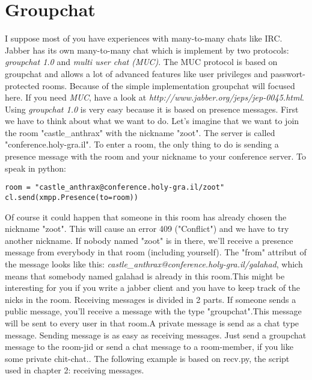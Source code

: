 \section{Groupchat}

I suppose most of you have experiences with many-to-many chats like IRC. Jabber has its own many-to-many chat which is implement by two protocols: \textit{groupchat 1.0} and \textit{multi user chat (MUC)}.
The MUC protocol is based on groupchat and allows a lot of advanced features like user privileges and passwort-protected rooms.
Because of the simple implementation groupchat will focused here.
If you need \textit{MUC}, have a look at \textit{http://www.jabber.org/jeps/jep-0045.html}.
\newline
\newline
Using \textit{groupchat 1.0} is very easy because it is based on presence messages.
First we have to think about what we want to do. Let's imagine that we want to join the room "castle\_anthrax" with the nickname "zoot". The server is called "conference.holy-gra.il".
To enter a room, the only thing to do is sending a presence message with the room and your nickname to your conference server.
\newline
To speak in python:
\begin{verbatim}
room = "castle_anthrax@conference.holy-gra.il/zoot"
cl.send(xmpp.Presence(to=room))
\end{verbatim}
Of course it could happen that someone in this room has already chosen the nickname "zoot". This will cause an error 409 ("Conflict") and we have to try another nickname.
\newline
If nobody named "zoot" is in there, we'll receive a presence message from everybody in that room (including yourself).
The "from" attribut of the message looks like this: \textit{castle\_anthrax@conference.holy-gra.il/galahad}, which means that somebody named galahad is already in this room.This might be interesting for you if you write a jabber client and you have to keep track of the nicks in the room.
\newline
Receiving messages is divided in 2 parts. If someone sends a public message, you'll receive a message with the type "groupchat".This message will be sent to every user in that room.A private message is send as a chat type message.
\newline
Sending message is as easy as receiving messages. Just send a groupchat message to the room-jid or send a chat message to a room-member, if you like some private chit-chat..
\newline
\newline
The following example is based on recv.py, the script used in chapter 2: receiving messages.


